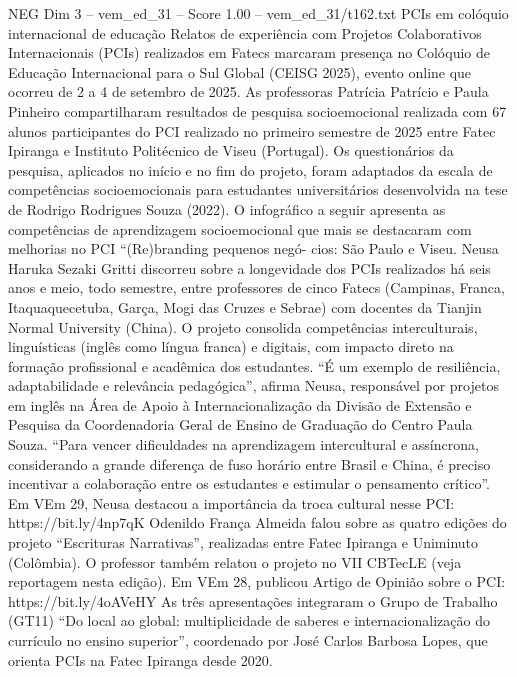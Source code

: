 \begin{textsample}{NEG Dim 3 – vem\_ed\_31 – Score 1.00 – vem\_ed\_31/t162.txt}  \label{ex:f3_neg_053}
PCIs em colóquio internacional de educação Relatos de experiência com Projetos Colaborativos Internacionais (PCIs) realizados em Fatecs marcaram presença no Colóquio de Educação Internacional para o Sul Global (CEISG 2025), evento online que ocorreu de 2 a 4 de setembro de 2025.
As professoras Patrícia Patrício e Paula Pinheiro compartilharam resultados de pesquisa socioemocional realizada com 67 alunos participantes do PCI realizado no primeiro semestre de 2025 entre Fatec Ipiranga e Instituto Politécnico de Viseu (Portugal).
Os questionários da pesquisa, aplicados no início e no fim do projeto, foram adaptados da escala de competências socioemocionais para estudantes universitários desenvolvida na tese de Rodrigo Rodrigues Souza (2022).
O infográfico a seguir apresenta as competências de aprendizagem socioemocional que mais se destacaram com melhorias no PCI “(Re)branding pequenos negó- cios: São Paulo e Viseu.
Neusa Haruka Sezaki Gritti discorreu sobre a longevidade dos PCIs realizados há seis anos e meio, todo semestre, entre professores de cinco Fatecs (Campinas, Franca, Itaquaquecetuba, Garça, Mogi das Cruzes e Sebrae) com docentes da Tianjin Normal University (China).
O projeto consolida competências interculturais, linguísticas (inglês como língua franca) e digitais, com impacto direto na formação profissional e acadêmica dos estudantes. “É um exemplo de resiliência, adaptabilidade e relevância pedagógica”, afirma Neusa, responsável por projetos em inglês na Área de Apoio à Internacionalização da Divisão de Extensão e Pesquisa da Coordenadoria Geral de Ensino de Graduação do Centro Paula Souza. “Para vencer dificuldades na aprendizagem intercultural e assíncrona, considerando a grande diferença de fuso horário entre Brasil e China, é preciso incentivar a colaboração entre os estudantes e estimular o pensamento crítico”.
Em VEm 29, Neusa destacou a importância da troca cultural nesse PCI: https://bit.ly/4np7qK Odenildo França Almeida falou sobre as quatro edições do projeto “Escrituras Narrativas”, realizadas entre Fatec Ipiranga e Uniminuto (Colômbia).
O professor também relatou o projeto no VII CBTecLE (veja reportagem nesta edição).
Em VEm 28, publicou Artigo de Opinião sobre o PCI: https://bit.ly/4oAVeHY As três apresentações integraram o Grupo de Trabalho (GT11) “Do local ao global: multiplicidade de saberes e internacionalização do currículo no ensino superior”, coordenado por José Carlos Barbosa Lopes, que orienta PCIs na Fatec Ipiranga desde 2020.

\end{textsample}
